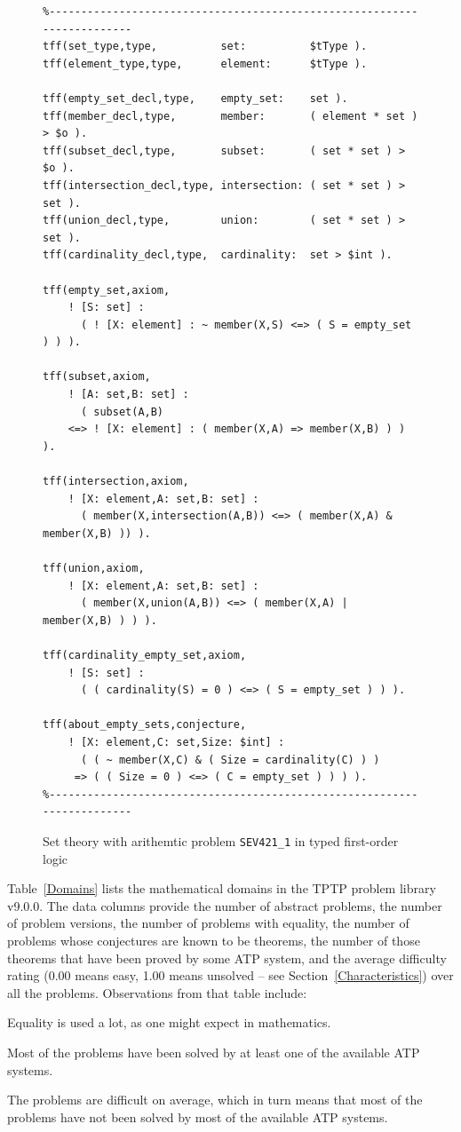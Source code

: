 \documentclass[runningheads]{llncs}
\newenvironment{packed_itemize}{
\vspace*{-0.2em}
\begin{itemize}
\setlength{\partopsep}{0pt}
\setlength{\itemsep}{1pt}
\setlength{\parskip}{0pt}
\setlength{\parsep}{0pt}
}{\end{itemize}}
\begin{document}
\begin{figure}[htb]
\centering
{\footnotesize
{\setlength{\baselineskip}{3mm}
\begin{verbatim}
%------------------------------------------------------------------------
tff(set_type,type,          set:          $tType ).
tff(element_type,type,      element:      $tType ).

tff(empty_set_decl,type,    empty_set:    set ).
tff(member_decl,type,       member:       ( element * set ) > $o ).
tff(subset_decl,type,       subset:       ( set * set ) > $o ).
tff(intersection_decl,type, intersection: ( set * set ) > set ).
tff(union_decl,type,        union:        ( set * set ) > set ).
tff(cardinality_decl,type,  cardinality:  set > $int ).

tff(empty_set,axiom,
    ! [S: set] :
      ( ! [X: element] : ~ member(X,S) <=> ( S = empty_set ) ) ).

tff(subset,axiom,
    ! [A: set,B: set] :
      ( subset(A,B)
    <=> ! [X: element] : ( member(X,A) => member(X,B) ) ) ).

tff(intersection,axiom,
    ! [X: element,A: set,B: set] :
      ( member(X,intersection(A,B)) <=> ( member(X,A) & member(X,B) )) ).

tff(union,axiom,
    ! [X: element,A: set,B: set] :
      ( member(X,union(A,B)) <=> ( member(X,A) | member(X,B) ) ) ).

tff(cardinality_empty_set,axiom,
    ! [S: set] :
      ( ( cardinality(S) = 0 ) <=> ( S = empty_set ) ) ).

tff(about_empty_sets,conjecture,
    ! [X: element,C: set,Size: $int] :
      ( ( ~ member(X,C) & ( Size = cardinality(C) ) )
     => ( ( Size = 0 ) <=> ( C = empty_set ) ) ) ).
%------------------------------------------------------------------------
\end{verbatim}
}}
\caption{Set theory with arithemtic problem {\tt SEV421\_1} in typed first-order logic}
\label{ExampleTF0}
\end{figure}

Table~\ref{Domains} lists the mathematical domains in the TPTP problem library v9.0.0.
The data columns provide the number of abstract problems, the number of problem versions, the
number of problems with equality, the number of problems whose conjectures are known to be
theorems, the number of those theorems that have been proved by some ATP system, and the average 
difficulty rating (0.00 means easy, 1.00 means unsolved -- see Section~\ref{Characteristics}) over 
all the problems.
Observations from that table include:
\begin{packed_itemize}
\item Equality is used a lot, as one might expect in mathematics.
\item Most of the problems have been solved by at least one of the available ATP systems.
\item The problems are difficult on average, which in turn means that most of the problems have
      not been solved by most of the available ATP systems.
\end{packed_itemize}
\end{document}
